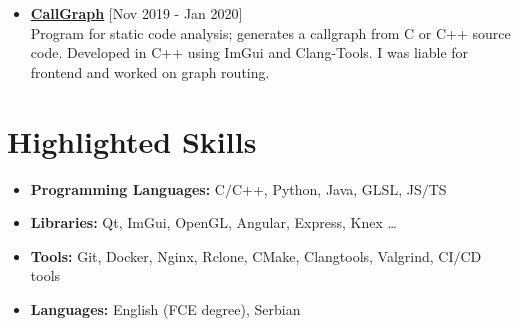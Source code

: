 \documentclass[a4paper]{moderncv}
\begin{document}
\begin{itemize}

			\item \textbf{\href{https://github.com/djordjetane/CallGraph}{CallGraph}} \hfill[Nov 2019 - Jan 2020]\\
			Program for static code analysis; generates a callgraph from C or C++ source code. Developed in C++ using 
			ImGui and Clang-Tools. I was liable for frontend and worked on graph routing.

		\end{itemize}

\section{Highlighted Skills}

	\begin{itemize}
		
		\item \textbf{Programming Languages: } C$\slash$C++, Python, Java, GLSL, JS$\slash$TS
		\item \textbf{Libraries: } Qt, ImGui, OpenGL, Angular, Express, Knex \dots
		\item \textbf{Tools: } Git, Docker, Nginx, Rclone, CMake, Clangtools, Valgrind, CI$\slash$CD tools		
		\item \textbf{Languages: } English (FCE degree), Serbian
		
	\end{itemize}
%
%
\end{document}
